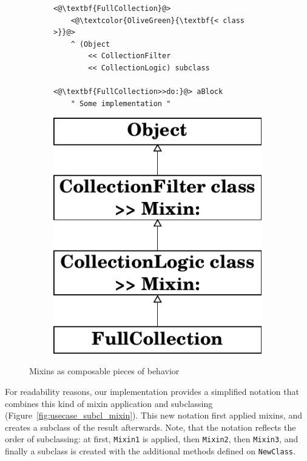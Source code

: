\begin{figure}[!htp]
\centering
\begin{subfigure}[b]{0.6\textwidth}
\begin{lstlisting}
<@\textbf{FullCollection}@>
    <@\textcolor{OliveGreen}{\textbf{< class >}}@>
    ^ (Object 
        << CollectionFilter 
        << CollectionLogic) subclass

<@\textbf{FullCollection>>do:}@> aBlock
    " Some implementation "
\end{lstlisting}
\end{subfigure}
\qquad
\begin{subfigure}[b]{0.25\textwidth}
    \includegraphics[width=\textwidth]{usecase_classgen_v2.pdf}
\end{subfigure}
\caption{Mixins as composable pieces of behavior}
\label{fig:mixin_composable}
\end{figure}

For readability reasons, our implementation provides a simplified notation that combines this kind of mixin application and subclassing (Figure~\ref{fig:usecase_subcl_mixin}). This new notation first applied mixins, and creates a subclass of the result afterwards. Note, that the notation reflects the order of subclassing: at first, \texttt{Mixin1} is applied, then \texttt{Mixin2}, then \texttt{Mixin3}, and finally a subclass is created with the additional methods defined on \texttt{NewClass}.

